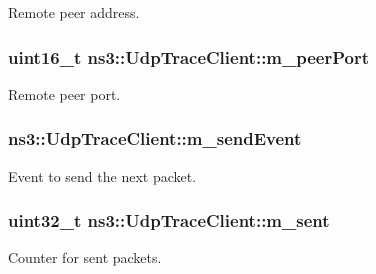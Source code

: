 Remote peer address. 

\subsubsection[{\texorpdfstring{m\+\_\+peer\+Port}{m_peerPort}}]{\setlength{\rightskip}{0pt plus 5cm}uint16\+\_\+t ns3\+::\+Udp\+Trace\+Client\+::m\+\_\+peer\+Port\hspace{0.3cm}{\ttfamily [private]}}\hypertarget{structns3_1_1UdpTraceClient_a218996a58ca6cb1a17edd8df252596f5}{}\label{structns3_1_1UdpTraceClient_a218996a58ca6cb1a17edd8df252596f5}


Remote peer port. 

\subsubsection[{\texorpdfstring{m\+\_\+send\+Event}{m_sendEvent}}]{ ns3\+::\+Udp\+Trace\+Client\+::m\+\_\+send\+Event\hspace{0.3cm}{\ttfamily [private]}}\hypertarget{structns3_1_1UdpTraceClient_a0190e0401d6d08774bdf89ccc4799a28}{}\label{structns3_1_1UdpTraceClient_a0190e0401d6d08774bdf89ccc4799a28}


Event to send the next packet. 

\subsubsection[{\texorpdfstring{m\+\_\+sent}{m_sent}}]{\setlength{\rightskip}{0pt plus 5cm}uint32\+\_\+t ns3\+::\+Udp\+Trace\+Client\+::m\+\_\+sent\hspace{0.3cm}{\ttfamily [private]}}\hypertarget{structns3_1_1UdpTraceClient_a226ae5b31c9f4777726bc6cc188c6a85}{}\label{structns3_1_1UdpTraceClient_a226ae5b31c9f4777726bc6cc188c6a85}


Counter for sent packets. 

